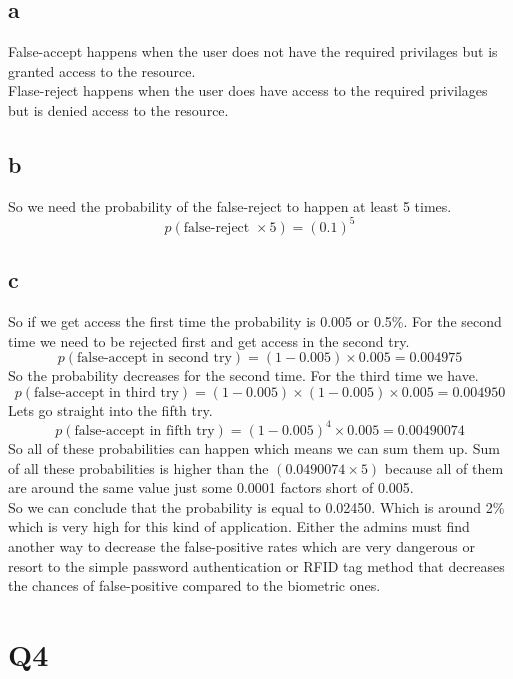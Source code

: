\documentclass[a4paper, 11pt]{article}
\begin{document}
\subsection{a}
False-accept happens when the user does not have the required privilages but
is granted access to the resource. \\
Flase-reject happens when the user does have access to the required privilages
but is denied access to the resource.
\subsection{b}
So we need the probability of the false-reject to happen at least 5 times.
\begin{equation}
    p(\text{false-reject } \times 5) = (0.1) ^ 5
\end{equation}
\subsection{c}
So if we get access the first time the probability is 0.005 or 0.5\%.
For the second time we need to be rejected first and get access in the second
try.
\begin{equation}
    p(\text{false-accept in second try}) = (1 - 0.005) \times 0.005 = 0.004975
\end{equation}
So the probability decreases for the second time. For the third time we have.
\begin{equation}
    p(\text{false-accept in third try}) = (1 - 0.005) \times (1 - 0.005)
    \times 0.005 = 0.004950
\end{equation}
Lets go straight into the fifth try.
\begin{equation}
    p(\text{false-accept in fifth try}) = (1 - 0.005)^4 \times 0.005 = 0.00490074
\end{equation}
So all of these probabilities can happen which means we can sum them up.
Sum of all these probabilities is higher than the $(0.0490074 \times 5)$ because
all of them are around the same value just some 0.0001 factors short of 0.005.
\\
So we can conclude that the probability is equal to 0.02450.
Which is around 2\% which is very high for this kind of application.
Either the admins must find another way to decrease the false-positive rates
which are very dangerous or resort to the simple password authentication or
RFID tag method that decreases the chances of false-positive compared to the
biometric ones.
\section{Q4}
\end{document}
